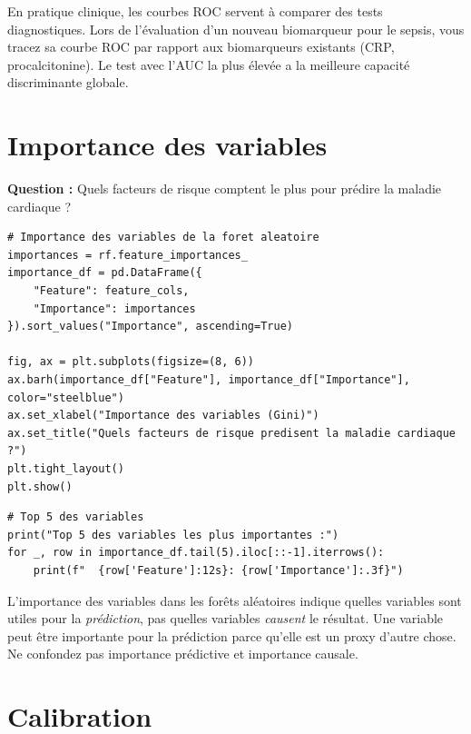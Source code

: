 \begin{clinicalnote}
En pratique clinique, les courbes ROC servent \`a comparer des tests diagnostiques. Lors de l'\'evaluation d'un nouveau biomarqueur pour le sepsis, vous tracez sa courbe ROC par rapport aux biomarqueurs existants (CRP, procalcitonine). Le test avec l'AUC la plus \'elev\'ee a la meilleure capacit\'e discriminante globale.
\end{clinicalnote}

\section{Importance des variables}

\textbf{Question :} Quels facteurs de risque comptent le plus pour pr\'edire la maladie cardiaque ?

\begin{verbatim}
# Importance des variables de la foret aleatoire
importances = rf.feature_importances_
importance_df = pd.DataFrame({
    "Feature": feature_cols,
    "Importance": importances
}).sort_values("Importance", ascending=True)

fig, ax = plt.subplots(figsize=(8, 6))
ax.barh(importance_df["Feature"], importance_df["Importance"], color="steelblue")
ax.set_xlabel("Importance des variables (Gini)")
ax.set_title("Quels facteurs de risque predisent la maladie cardiaque ?")
plt.tight_layout()
plt.show()
\end{verbatim}

\begin{verbatim}
# Top 5 des variables
print("Top 5 des variables les plus importantes :")
for _, row in importance_df.tail(5).iloc[::-1].iterrows():
    print(f"  {row['Feature']:12s}: {row['Importance']:.3f}")
\end{verbatim}

\begin{warningbox}
L'importance des variables dans les for\^ets al\'eatoires indique quelles variables sont utiles pour la \emph{pr\'ediction}, pas quelles variables \emph{causent} le r\'esultat. Une variable peut \^etre importante pour la pr\'ediction parce qu'elle est un proxy d'autre chose. Ne confondez pas importance pr\'edictive et importance causale.
\end{warningbox}

\section{Calibration}

